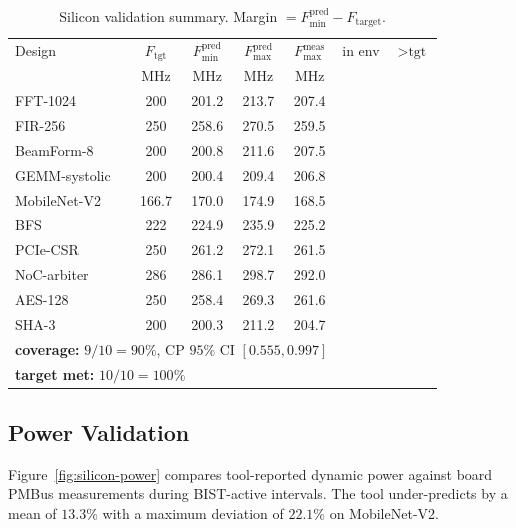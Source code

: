 \documentclass[journal]{IEEEtran}
\newcommand{\cmark}{{\color{robingreen}\ding{51}}}
\newcommand{\xmark}{{\color{robinred}\ding{55}}}
\begin{document}
\begin{table}[t]
\centering
\caption{Silicon validation summary. Margin $= F_{\min}^{\text{pred}} - F_{\text{target}}$.}
\label{tab:silicon-summary}
\setlength{\tabcolsep}{3.5pt}
\renewcommand{\arraystretch}{1.05}
\footnotesize
\begin{tabular}{lcccccc}
\toprule
Design & $F_{\text{tgt}}$ & $F_{\min}^{\text{pred}}$ & $F_{\max}^{\text{pred}}$ & $F_{\max}^{\text{meas}}$ & in env & ${>}\text{tgt}$ \\
       & MHz & MHz & MHz & MHz & & \\
\midrule
FFT-1024        & 200 & 201.2 & 213.7 & 207.4 & \cmark & \cmark \\
FIR-256         & 250 & 258.6 & 270.5 & 259.5 & \cmark & \cmark \\
BeamForm-8      & 200 & 200.8 & 211.6 & 207.5 & \cmark & \cmark \\
GEMM-systolic   & 200 & 200.4 & 209.4 & 206.8 & \cmark & \cmark \\
MobileNet-V2    & 166.7 & 170.0 & 174.9 & \textcolor{robinred}{168.5} & \textcolor{robinred}{\xmark} & \cmark \\
BFS             & 222 & 224.9 & 235.9 & 225.2 & \cmark & \cmark \\
PCIe-CSR        & 250 & 261.2 & 272.1 & 261.5 & \cmark & \cmark \\
NoC-arbiter     & 286 & 286.1 & 298.7 & 292.0 & \cmark & \cmark \\
AES-128         & 250 & 258.4 & 269.3 & 261.6 & \cmark & \cmark \\
SHA-3           & 200 & 200.3 & 211.2 & 204.7 & \cmark & \cmark \\
\midrule
\multicolumn{5}{l}{\textbf{coverage:} $9/10=90\%$, CP $95\%$ CI $[0.555,0.997]$} & & \\
\multicolumn{5}{l}{\textbf{target met:} $10/10=100\%$} & & \\
\bottomrule
\end{tabular}
\end{table}

\subsection{Power Validation}
\label{sec:silicon-power}

Figure~\ref{fig:silicon-power} compares tool-reported dynamic power against board PMBus measurements during BIST-active intervals. The tool under-predicts by a mean of $13.3\%$ with a maximum deviation of $22.1\%$ on MobileNet-V2.
\end{document}
